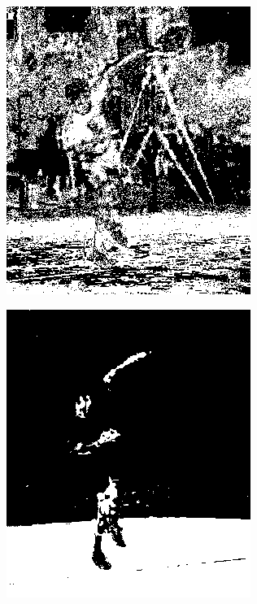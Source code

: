 \begin{figure}[h]
\begin{subfigure}[b]{0.18\textwidth}
         \includegraphics[width=\textwidth]{images/results/base_st/ivan1_bayes.png}
     \end{subfigure}
    \hfill
     \begin{subfigure}[b]{0.18\textwidth}
         \centering
         \includegraphics[width=\textwidth]{images/results/base_st/ivan1_dyc.png}

\end{subfigure}
\end{figure}

